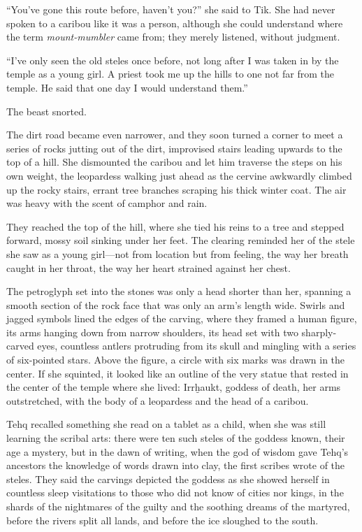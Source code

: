 ``You've gone this route before, haven't you?'' she said to Tik. She had never spoken to a caribou like it was a person, although she could understand where the term \emph{mount-mumbler} came from; they merely listened, without judgment.

``I've only seen the old steles once before, not long after I was taken in by the temple as a young girl. A priest took me up the hills to one not far from the temple. He said that one day I would understand them.''

The beast snorted.

The dirt road became even narrower, and they soon turned a corner to meet a series of rocks jutting out of the dirt, improvised stairs leading upwards to the top of a hill. She dismounted the caribou and let him traverse the steps on his own weight, the leopardess walking just ahead as the cervine awkwardly climbed up the rocky stairs, errant tree branches scraping his thick winter coat. The air was heavy with the scent of camphor and rain.

They reached the top of the hill, where she tied his reins to a tree and stepped forward, mossy soil sinking under her feet. The clearing reminded her of the stele she saw as a young girl---not from location but from feeling, the way her breath caught in her throat, the way her heart strained against her chest.

The petroglyph set into the stones was only a head shorter than her, spanning a smooth section of the rock face that was only an arm's length wide. Swirls and jagged symbols lined the edges of the carving, where they framed a human figure, its arms hanging down from narrow shoulders, its head set with two sharply-carved eyes, countless antlers protruding from its skull and mingling with a series of six-pointed stars. Above the figure, a circle with six marks was drawn in the center. If she squinted, it looked like an outline of the very statue that rested in the center of the temple where she lived: Irrḫaukt, goddess of death, her arms outstretched, with the body of a leopardess and the head of a caribou.

Tehq recalled something she read on a tablet as a child, when she was still learning the scribal arts: there were ten such steles of the goddess known, their age a mystery, but in the dawn of writing, when the god of wisdom gave Tehq's ancestors the knowledge of words drawn into clay, the first scribes wrote of the steles. They said the carvings depicted the goddess as she showed herself in countless sleep visitations to those who did not know of cities nor kings, in the shards of the nightmares of the guilty and the soothing dreams of the martyred, before the rivers split all lands, and before the ice sloughed to the south.

